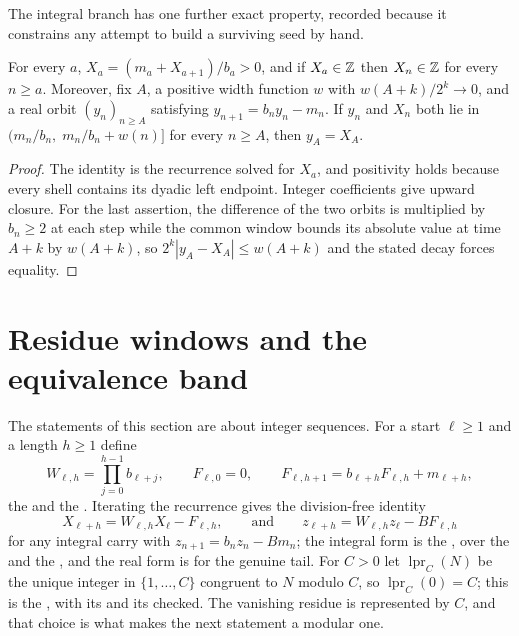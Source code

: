 \documentclass[11pt]{article}
\newcommand{\lpr}{\operatorname{lpr}}
\begin{document}
The integral branch has one further exact property, recorded because it
constrains any attempt to build a surviving seed by hand.

\begin{proposition}\label{long269:res:pinning}
For every $a$, $X_a=(m_a+X_{a+1})/b_a>0$, and if $X_a\in\mathbb{Z}$ then $X_n\in\mathbb{Z}$ for
every $n\ge a$.  Moreover, fix $A$, a positive width function $w$ with
$w(A+k)/2^{k}\to0$, and a real orbit $(y_n)_{n\ge A}$ satisfying
$y_{n+1}=b_ny_n-m_n$.  If $y_n$ and $X_n$ both lie in
$(m_n/b_n,\;m_n/b_n+w(n)]$ for every $n\ge A$, then $y_A=X_A$.
\end{proposition}

\begin{proof}
The identity is the recurrence solved for $X_a$, and positivity holds because
every shell contains its dyadic left endpoint.  Integer coefficients give
upward closure.  For the last assertion, the difference of the two orbits is
multiplied by $b_n\ge2$ at each step while the common window bounds its
absolute value at time $A+k$ by $w(A+k)$, so $2^{k}|y_A-X_A|\le w(A+k)$ and the
stated decay forces equality.
\end{proof}

\section{Residue windows and the equivalence band}\label{long269:sec:escape}

The statements of this section are about integer sequences.  For a start
$\ell\ge1$ and a length $h\ge1$ define
\[
 W_{\ell,h}=\prod_{j=0}^{h-1}b_{\ell+j},
 \qquad
 F_{\ell,0}=0,
 \qquad
 F_{\ell,h+1}=b_{\ell+h}F_{\ell,h}+m_{\ell+h},
\]
the
 and the
.
Iterating the recurrence gives the division-free identity
\begin{equation}\label{long269:eq:window-identity}
 X_{\ell+h}=W_{\ell,h}X_\ell-F_{\ell,h},
 \qquad\text{and}\qquad
 z_{\ell+h}=W_{\ell,h}z_\ell-BF_{\ell,h}
\end{equation}
for any integral carry with $z_{n+1}=b_nz_n-Bm_n$; the integral form is the
, over the
 and the
, and the real form is
for the genuine tail.  For $C>0$ let $\lpr_C(N)$ be the unique integer in
$\{1,\ldots,C\}$ congruent to $N$ modulo $C$, so $\lpr_C(0)=C$; this is the
, with its
 and
its
checked.  The vanishing residue is represented by $C$, and that choice is what
makes the next statement a modular one.
\end{document}
